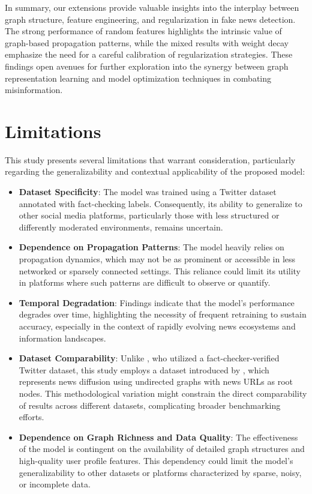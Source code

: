 \documentclass[sigconf,nonacm]{acmart}
\begin{document}
In summary, our extensions provide valuable insights into the interplay between graph structure, feature engineering, and regularization in fake news detection. The strong performance of random features highlights the intrinsic value of graph-based propagation patterns, while the mixed results with weight decay emphasize the need for a careful calibration of regularization strategies. These findings open avenues for further exploration into the synergy between graph representation learning and model optimization techniques in combating misinformation.



\section{Limitations}

This study presents several limitations that warrant consideration, particularly regarding the generalizability and contextual applicability of the proposed model:

\begin{itemize}
    \item \textbf{Dataset Specificity}: The model was trained using a Twitter dataset annotated with fact-checking labels. Consequently, its ability to generalize to other social media platforms, particularly those with less structured or differently moderated environments, remains uncertain.

    \item \textbf{Dependence on Propagation Patterns}: The model heavily relies on propagation dynamics, which may not be as prominent or accessible in less networked or sparsely connected settings. This reliance could limit its utility in platforms where such patterns are difficult to observe or quantify.

    \item \textbf{Temporal Degradation}: Findings indicate that the model's performance degrades over time, highlighting the necessity of frequent retraining to sustain accuracy, especially in the context of rapidly evolving news ecosystems and information landscapes.

    \item \textbf{Dataset Comparability}: Unlike \cite{monti2019fakenewsdetectionsocial}, who utilized a fact-checker-verified Twitter dataset, this study employs a dataset introduced by \cite{10.1145/3404835.3462990}, which represents news diffusion using undirected graphs with news URLs as root nodes. This methodological variation might constrain the direct comparability of results across different datasets, complicating broader benchmarking efforts.

    \item \textbf{Dependence on Graph Richness and Data Quality}: The effectiveness of the model is contingent on the availability of detailed graph structures and high-quality user profile features. This dependency could limit the model’s generalizability to other datasets or platforms characterized by sparse, noisy, or incomplete data.
\end{itemize}
\end{document}
